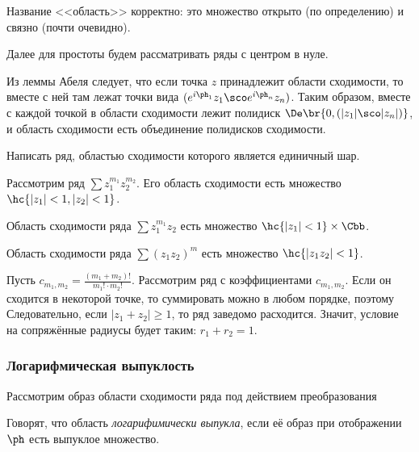 \documentclass[a4paper]{article}
\begin{document}
Название <<область>> корректно: это множество открыто (по определению) и связно (почти очевидно).

Далее для простоты будем рассматривать ряды с центром в нуле.

Из леммы Абеля следует, что если точка $z$ принадлежит области сходимости, то вместе с
ней там лежат точки вида $(e^{i\ph_1}z_1\sco e^{i\ph_n}z_n)$. Таким образом, вместе с
каждой точкой в области сходимости лежит полидиск $\De\br{0,(|z_1|\sco |z_n|)}$,
и область сходимости есть объединение полидисков сходимости.

\begin{problem}
Написать ряд, областью сходимости которого является единичный шар.
\end{problem}

\begin{ex}
Рассмотрим ряд $\sum z_1^{m_1}z_2^{m_2}$. Его область сходимости есть множество
$\hc{|z_1| < 1, |z_2| < 1}$.
\end{ex}

\begin{ex}
Область сходимости ряда $\sum z_1^{m_1}z_2$ есть множество $\hc{|z_1|<1}\times\Cbb$.
\end{ex}

\begin{ex}
Область сходимости ряда $\sum (z_1 z_2)^m$ есть множество $\hc{|z_1z_2|<1}$.
\end{ex}

\begin{ex}
Пусть $c_{m_1,m_2} = \frac{(m_1+m_2)!}{m_1!\cdot m_2!}$. Рассмотрим ряд с коэффициентами $c_{m_1,m_2}$.
Если он сходится в некоторой точке, то суммировать можно в любом порядке, поэтому
Следовательно, если $|z_1+z_2| \ge 1$, то ряд заведомо расходится. Значит, условие на сопряжённые
радиусы будет таким: $r_1+r_2=1$.
\end{ex}

\subsubsection{Логарифмическая выпуклость}

Рассмотрим образ области сходимости ряда под действием преобразования

\begin{df}
Говорят, что область \emph{логарифимически выпукла}, если её образ при отображении~$\ph$
есть выпуклое множество.
\end{df}
\end{document}
